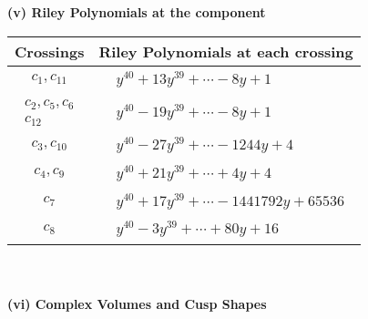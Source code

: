 \documentclass[1p]{elsarticle_modified}
\theoremstyle{definition}
\begin{document}
\newpage\renewcommand{\arraystretch}{1}
\flushleft \textbf{(v) Riley Polynomials at the component}\newline \\
\begin{tabular}{m{50pt}|m{274pt}}
Crossings & \hspace{64pt}Riley Polynomials at each crossing \\
\hline $$\begin{aligned}c_{1},c_{11}\end{aligned}$$&$\begin{aligned}
&y^{40}+13 y^{39}+\cdots-8 y+1
\end{aligned}$\\
\hline $$\begin{aligned}c_{2},c_{5},c_{6}\\c_{12}\end{aligned}$$&$\begin{aligned}
&y^{40}-19 y^{39}+\cdots-8 y+1
\end{aligned}$\\
\hline $$\begin{aligned}c_{3},c_{10}\end{aligned}$$&$\begin{aligned}
&y^{40}-27 y^{39}+\cdots-1244 y+4
\end{aligned}$\\
\hline $$\begin{aligned}c_{4},c_{9}\end{aligned}$$&$\begin{aligned}
&y^{40}+21 y^{39}+\cdots+4 y+4
\end{aligned}$\\
\hline $$\begin{aligned}c_{7}\end{aligned}$$&$\begin{aligned}
&y^{40}+17 y^{39}+\cdots-1441792 y+65536
\end{aligned}$\\
\hline $$\begin{aligned}c_{8}\end{aligned}$$&$\begin{aligned}
&y^{40}-3 y^{39}+\cdots+80 y+16
\end{aligned}$\\
\hline
\end{tabular}\\~\\
\newpage\flushleft \textbf{(vi) Complex Volumes and Cusp Shapes}
\end{document}
